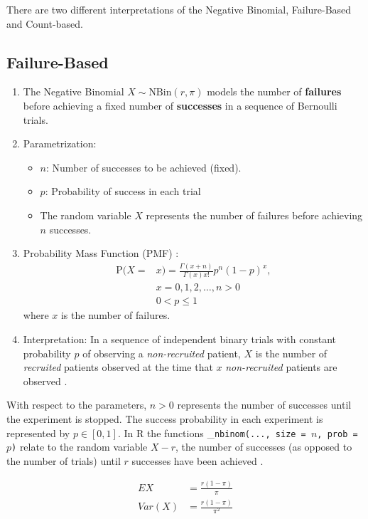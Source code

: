 There are two different interpretations of the Negative Binomial, Failure-Based and Count-based.
\subsection{Failure-Based}
\begin{enumerate}
\item The Negative Binomial $X\sim\textrm{NBin}(r,\pi)$ models the number of \textbf{failures} before achieving a fixed number of \textbf{successes} in a sequence of Bernoulli trials. 
\item Parametrization:
	\begin{itemize}
	\item $n$: Number of successes to be achieved (fixed).
	\item $p$: Probability of success in each trial
	\item The random variable $X$ represents the number of failures before achieving $n$ successes.
	\end{itemize}
\item Probability Mass Function (PMF) \citep{R-stats}:
\begin{align*}
\textrm{P}(X=&x) = \frac{\Gamma(x+n)}{\Gamma(x) x!}  p^n(1-p)^x, \\
&x = 0,1,2, \ldots, n >0\\
&0<p\leq 1
\end{align*}
where $x$ is the number of failures.
\item Interpretation: In a sequence of independent binary trials with constant probability $p$ of observing a \textit{non-recruited} patient, $X$ is the number of \textit{recruited} patients observed at the time that $x$ \textit{non-recruited} patients are observed \citep{meeker2017statistical}.


\end{enumerate}

With respect to the parameters, $n>0$ represents the number of successes until 
the experiment is stopped. The success probability in each experiment is 
represented by $p\in[0,1]$.  In R the functions \_\texttt{nbinom(..., size = $n$, prob = $p$)} relate to the random variable $X-r$, the number of successes (as opposed to the number of trials) until $r$ successes have been achieved \citep{held2014applied}. 

\begin{align*}
EX & = \frac{r(1-\pi)}{\pi}\\
Var(X) & = \frac{r(1-\pi)}{\pi^2}
\end{align*}

